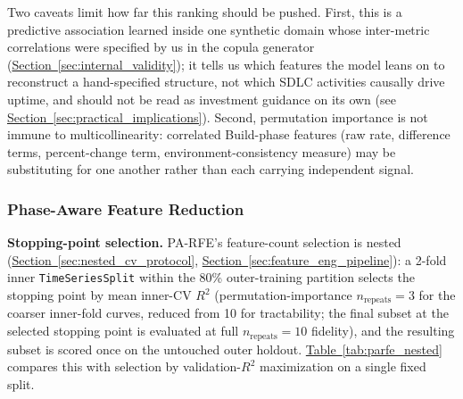 \documentclass[technologies,article,submit,pdftex,moreauthors]{Definitions/mdpi}
\begin{document}
Two caveats limit how far this ranking should be pushed. First, this is a predictive association learned inside one synthetic domain whose inter-metric correlations were specified by us in the copula generator (\hyperref[sec:internal_validity]{Section~\ref*{sec:internal_validity}}); it tells us which features the model leans on to reconstruct a hand-specified structure, not which SDLC activities causally drive uptime, and should not be read as investment guidance on its own (see \hyperref[sec:practical_implications]{Section~\ref*{sec:practical_implications}}). Second, permutation importance is not immune to multicollinearity: correlated Build-phase features (raw rate, difference terms, percent-change term, environment-consistency measure) may be substituting for one another rather than each carrying independent signal.

\subsubsection{Phase-Aware Feature Reduction}\label{sec:parfe_results}

\textbf{Stopping-point selection.} PA-RFE's feature-count selection is nested (\hyperref[sec:nested_cv_protocol]{Section~\ref*{sec:nested_cv_protocol}}, \hyperref[sec:feature_eng_pipeline]{Section~\ref*{sec:feature_eng_pipeline}}): a 2-fold inner \texttt{TimeSeriesSplit} within the 80\% outer-training partition selects the stopping point by mean inner-CV \(R^2\) (permutation-importance \(n_{\text{repeats}}=3\) for the coarser inner-fold curves, reduced from 10 for tractability; the final subset at the selected stopping point is evaluated at full \(n_{\text{repeats}}=10\) fidelity), and the resulting subset is scored once on the untouched outer holdout. \hyperref[tab:parfe_nested]{Table~\ref*{tab:parfe_nested}} compares this with selection by validation-\(R^2\) maximization on a single fixed split.
\end{document}
